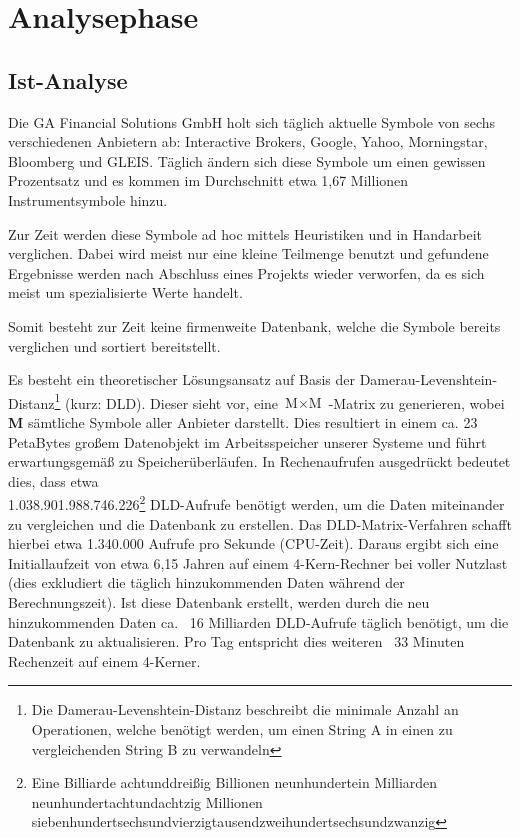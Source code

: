 \section{Analysephase}
\label{section:analysephase}
\subsection{Ist-Analyse}
Die GA Financial Solutions GmbH holt sich täglich aktuelle Symbole von sechs verschiedenen
Anbietern ab: Interactive Brokers, Google, Yahoo, Morningstar, Bloomberg und GLEIS.
Täglich ändern sich diese Symbole um einen gewissen Prozentsatz und es kommen im 
Durchschnitt etwa 1,67 Millionen Instrumentsymbole hinzu.\par

Zur Zeit werden diese Symbole ad hoc mittels Heuristiken und in Handarbeit verglichen.
Dabei wird meist nur eine kleine Teilmenge benutzt und gefundene Ergebnisse werden
nach Abschluss eines Projekts wieder verworfen, da es sich meist um spezialisierte Werte handelt.\par

Somit besteht zur Zeit keine firmenweite Datenbank, welche die Symbole
bereits verglichen und sortiert bereitstellt.\par

Es besteht ein theoretischer Lösungsansatz auf Basis der 
Damerau-Levenshtein-Distanz\footnote{Die Damerau-Levenshtein-Distanz\cite{dl_distance} 
beschreibt die minimale Anzahl an Operationen, welche benötigt werden, um einen 
String A in einen zu vergleichenden String B zu verwandeln} (kurz: DLD). 
Dieser sieht vor, eine $\text{M} \times \text{M}$ -Matrix zu generieren, wobei \textbf{M} sämtliche Symbole aller
Anbieter darstellt. Dies resultiert in einem ca. 23 PetaBytes großem Datenobjekt
im Arbeitsspeicher unserer Systeme und führt erwartungsgemäß zu Speicherüberläufen.
In Rechenaufrufen ausgedrückt bedeutet dies, dass etwa \\
1.038.901.988.746.226\footnote{Eine Billiarde achtunddreißig Billionen neunhundertein Milliarden neunhundertachtundachtzig Millionen siebenhundertsechsundvierzigtausendzweihundertsechsundzwanzig} DLD-Aufrufe benötigt werden, um die Daten miteinander
zu vergleichen und die Datenbank zu erstellen. Das DLD-Matrix-Verfahren schafft hierbei 
etwa 1.340.000 Aufrufe pro Sekunde (CPU-Zeit).
Daraus ergibt sich eine Initiallaufzeit von etwa 6,15 Jahren auf einem 4-Kern-Rechner bei voller Nutzlast (dies exkludiert die täglich hinzukommenden Daten
während der Berechnungszeit). Ist diese Datenbank erstellt, werden durch die neu
hinzukommenden Daten ca. ~16 Milliarden DLD-Aufrufe täglich benötigt, um die
Datenbank zu aktualisieren. Pro Tag entspricht dies weiteren ~33 Minuten Rechenzeit auf
einem 4-Kerner.\par

